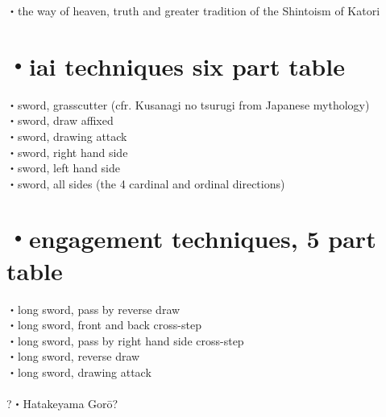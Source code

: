 \documentclass[dvipdfmx, a4paper, 12pt]{utarticle}
\begin{document}
\begin{CJK*}{UTF8}{min}
\begin{landscape}
\setcounter{section}{0}
\newpage
\pagestyle{empty}
・the way of heaven, truth and greater tradition of the Shintoism of Katori\\
\section{・iai techniques six part table}
\noindent {}・sword, grasscutter (cfr. Kusanagi no tsurugi from Japanese mythology)\\
・sword, draw affixed\\
・sword, drawing attack\\
・sword, right hand side\\
・sword, left hand side\\
・sword, all sides (the 4 cardinal and ordinal directions)\\
\section{・engagement techniques, 5 part table}
\noindent {}・long sword, pass by reverse draw\\
・long sword, front and back cross-step\\
・long sword, pass by right hand side cross-step\\
・long sword, reverse draw\\
・long sword, drawing attack\\
\\
?・Hatakeyama Gor\={o}?

\end{landscape}
\end{CJK*}
\end{document}
